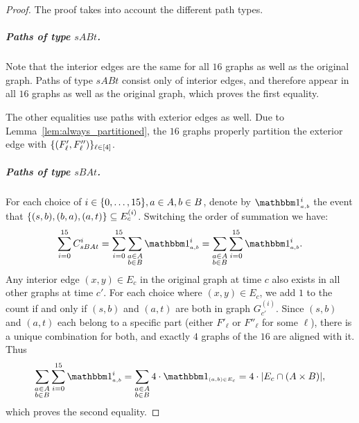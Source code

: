 \documentclass[letter,11pt]{article}
\begin{document}
\begin{proof}
    The proof takes into account the different path types.
    \subparagraph{Paths of type $sABt$.}
    Note that the interior edges are the same for all $16$ graphs as well as the original graph. Paths of type $sABt$ consist only of interior edges, and therefore appear in all $16$ graphs as well as the original graph, which proves the first equality.
    
    The other equalities use paths with exterior edges as well. 
    Due to Lemma~\ref{lem:always_partitioned}, the $16$ graphs properly partition the exterior edge with $\{(F'_{\ell}, F''_{\ell})\}_{\ell\in[4]}$. 
    
    \subparagraph{Paths of type $sBAt$.}
    For each choice of $i\in \{0,\dots,15\}, a\in A, b\in B$, denote by $\ind{a,b}^i$ the event that $\{(s,b), (b,a), (a,t)\} \subseteq E^{(i)}_c$. 
    Switching the order of summation we have:
    \[
\begin{aligned}
        \sum_{i=0}^{15} C^i_{sBAt}
        = \sum_{i=0}^{15} \sum_{\substack{a\in A\\b\in B}} \ind{a,b}^i
        = \sum_{\substack{a\in A\\b\in B}} \sum_{i=0}^{15} 
          \ind{a,b}^i .
    \end{aligned}
\]
    Any interior edge $(x,y)\in E_{c}$ in the original graph at time $c$ also exists in all other graphs at time $c'$.
    For each choice where $(x,y)\in E_c$, we add $1$ to the count if and only if $(s,b)$ and $(a,t)$ are both in graph $G^{(i)}_{c'}$.
    Since $(s,b)$ and $(a,t)$ each belong to a specific part (either $F'_{\ell}$ or $F''_{\ell}$ for some $\ell$), there is a unique combination for both, and exactly $4$ graphs of the $16$ are aligned with it. Thus
    \[
\begin{aligned}
        \sum_{\substack{a\in A\\b\in B}} \sum_{i=0}^{15} 
          \ind{a,b}^i
        = \sum_{\substack{a\in A\\b\in B}}
          4\cdot \ind{(a,b)\in E_c}
        = 4\cdot \card{E_c \cap \left(A \times B\right)} ,
    \end{aligned}
\]
    which proves the second equality.


\end{proof}
\end{document}
